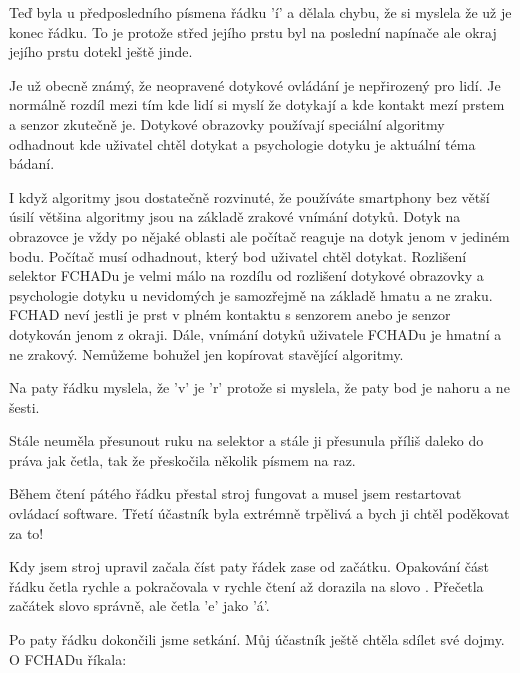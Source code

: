 Teď byla u předposledního písmena řádku 'í' a dělala chybu, že si myslela že už je konec řádku.  To je protože střed jejího prstu byl na poslední napínače ale okraj jejího prstu dotekl ještě jinde.

Je už obecně známý, že neopravené dotykové ovládání je nepřirozený pro lidí. Je normálně rozdíl mezi tím kde lidí si myslí že dotykají a kde kontakt mezí prstem a senzor zkutečně je.  Dotykové obrazovky používají speciální algoritmy odhadnout kde uživatel chtěl dotykat a psychologie dotyku je aktuální téma bádaní.

I když algoritmy jsou dostatečně rozvinuté, že používáte smartphony bez větší úsilí většina algoritmy jsou na základě zrakové vnímání dotyků.  Dotyk na obrazovce je vždy po nějaké oblasti ale počítač reaguje na dotyk jenom v jediném bodu.  Počítač musí odhadnout, který bod uživatel chtěl dotykat\citep{holz2011understanding}. Rozlišení selektor FCHADu je velmi málo na rozdílu od rozlišení dotykové obrazovky a psychologie dotyku u nevidomých je samozřejmě na základě hmatu a ne zraku.  FCHAD neví jestli je prst v plném kontaktu s senzorem anebo je senzor dotykován jenom z okraji.  Dále, vnímání dotyků uživatele FCHADu je hmatní a ne zrakový.  Nemůžeme bohužel jen kopírovat stavějící algoritmy.

Na paty řádku myslela, že 'v' je 'r' protože si myslela, že paty bod je nahoru a ne šesti.

Stále neuměla přesunout ruku na selektor a stále ji přesunula příliš daleko do práva jak četla, tak že přeskočila několik písmem na raz.

Během čtení pátého řádku přestal stroj fungovat a musel jsem restartovat ovládací software.  Třetí účastník byla extrémně trpělivá a bych ji chtěl poděkovat za to!

Kdy jsem stroj upravil začala číst paty řádek zase od začátku. Opakování část řádku četla rychle a pokračovala v rychle čtení až dorazila na slovo .  Přečetla začátek slovo správně, ale četla 'e' jako 'á'.

Po paty řádku dokončili jsme setkání. Můj účastník ještě chtěla sdílet své dojmy.  O FCHADu říkala:

\em {} \em

